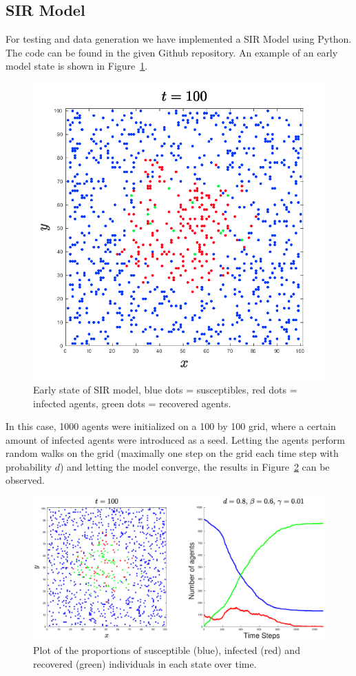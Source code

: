 \subsection{SIR Model}

For testing and data generation we have implemented a SIR Model using Python. The code can be found in the given Github repository.\newline
An example of an early model state is shown in Figure~\ref{fig:1}.

\begin{figure}[H]
	\centering
	\includegraphics[width=0.4\linewidth]{initial_setup.png}
	\caption{Early state of SIR model, blue dots = susceptibles, red dots = infected agents, green dots = recovered agents.}%
	\label{fig:1}
\end{figure}

In this case, 1000 agents were initialized on a 100 by 100 grid, where a certain amount of infected agents were introduced as a seed. Letting the agents perform random walks on the grid (maximally one step on the grid each time step with probability $d$) and letting the model converge, the results in Figure~\ref{fig:2} can be observed.

\begin{figure}[H]
	\centering
	\includegraphics[width=0.9\linewidth]{1_1000_agents}
	\caption{Plot of the proportions of susceptible (blue), infected (red) and recovered (green) individuals in each state over time.}%
	\label{fig:2}
\end{figure}

